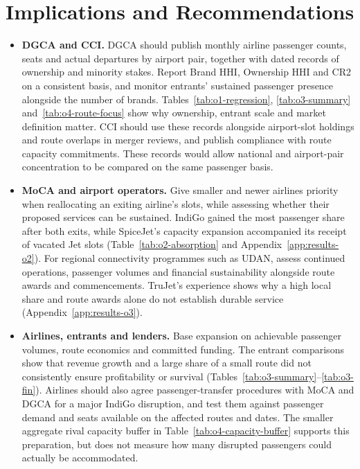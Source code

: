 \section{Implications and Recommendations}
\label{sec:review-recommendations}
\begingroup
\color{black}
\begin{itemize}[leftmargin=2em,itemsep=8pt,parsep=0pt,topsep=6pt]
    \item \textbf{DGCA and CCI.} DGCA should publish monthly airline passenger counts, seats and actual departures by airport pair, together with dated records of ownership and minority stakes. Report Brand HHI, Ownership HHI and CR2 on a consistent basis, and monitor entrants' sustained passenger presence alongside the number of brands. Tables~\ref{tab:o1-regression}, \ref{tab:o3-summary} and~\ref{tab:o4-route-focus} show why ownership, entrant scale and market definition matter. CCI should use these records alongside airport-slot holdings and route overlaps in merger reviews, and publish compliance with route capacity commitments. These records would allow national and airport-pair concentration to be compared on the same passenger basis.

    \item \textbf{MoCA and airport operators.} Give smaller and newer airlines priority when reallocating an exiting airline's slots, while assessing whether their proposed services can be sustained. IndiGo gained the most passenger share after both exits, while SpiceJet's capacity expansion accompanied its receipt of vacated Jet slots (Table~\ref{tab:o2-absorption} and Appendix~\ref{app:results-o2}). For regional connectivity programmes such as UDAN, assess continued operations, passenger volumes and financial sustainability alongside route awards and commencements. TruJet's experience shows why a high local share and route awards alone do not establish durable service (Appendix~\ref{app:results-o3}).

    \item \textbf{Airlines, entrants and lenders.} Base expansion on achievable passenger volumes, route economics and committed funding. The entrant comparisons show that revenue growth and a large share of a small route did not consistently ensure profitability or survival (Tables~\ref{tab:o3-summary}--\ref{tab:o3-fin}). Airlines should also agree passenger-transfer procedures with MoCA and DGCA for a major IndiGo disruption, and test them against passenger demand and seats available on the affected routes and dates. The smaller aggregate rival capacity buffer in Table~\ref{tab:o4-capacity-buffer} supports this preparation, but does not measure how many disrupted passengers could actually be accommodated.
\end{itemize}
\endgroup

